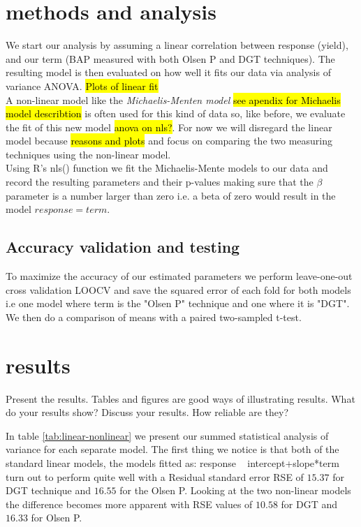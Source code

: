 \documentclass{article}
\begin{document}
\section{methods and analysis}
We start our analysis by assuming a linear correlation between response (yield), and our term (BAP measured with both Olsen P and DGT techniques). The resulting model is then evaluated on how well it fits our data via analysis of variance ANOVA. \hl{Plots of linear fit} \\ A non-linear model like the \textit{Michaelis-Menten model} \hl{see apendix for Michaelis model describtion} is often used for this kind of data so, like before, we evaluate the fit of this new model \hl{anova on nls?}. 
For now we will disregard the linear model because \hl{reasons and plots} and focus on comparing the two measuring techniques using the non-linear model. \\ Using R's nls() function we fit the Michaelis-Mente models to our data and record the resulting parameters and their p-values making sure that the $\beta$ parameter is a number larger than zero i.e. a beta of zero would result in the model $response = term$. 

\subsection{Accuracy validation and testing}
To maximize the accuracy of our estimated parameters we perform leave-one-out cross validation LOOCV and save the squared error of each fold for both models i.e one model where term is the "Olsen P" technique and one where it is "DGT". We then do a comparison of means with a paired two-sampled t-test.


\section{results}

Present the results.
Tables and figures are good ways of illustrating results.
What do your results show?
Discuss your results. How reliable are they?

In table \ref{tab:linear-nonlinear} we present our summed statistical analysis of variance for each separate model. The first thing we notice is that both of the standard linear models, the models fitted as: response ~ intercept+slope*term turn out to perform quite well with a Residual standard error RSE of $15.37$ for DGT technique and $16.55$ for the Olsen P. Looking at the two non-linear models the difference becomes more apparent with RSE values of $10.58$ for DGT and $16.33$ for Olsen P.
\end{document}
